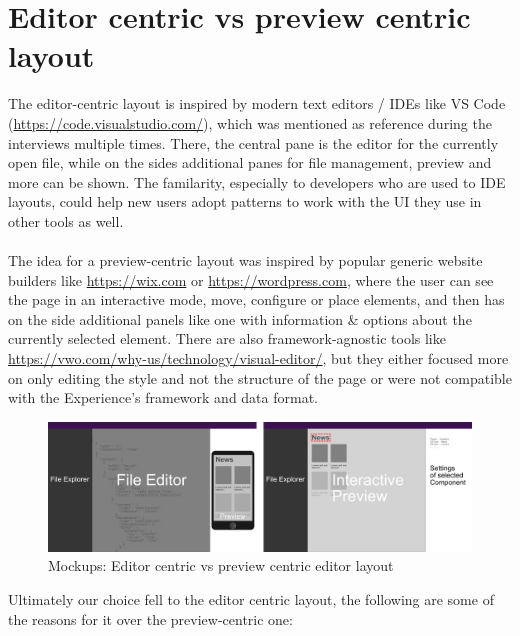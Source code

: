 \section{Editor centric vs preview centric layout}
The editor-centric layout is inspired by modern text editors / IDEs like VS Code (\url{https://code.visualstudio.com/}), which was mentioned as reference during the interviews multiple times.
There, the central pane is the editor for the currently open file, while on the sides additional panes for file management, preview and more can be shown.
The familarity, especially to developers who are used to IDE layouts, could help new users adopt patterns to work with the UI they use in other tools as well.
\\\\
The idea for a preview-centric layout was inspired by popular generic website builders like \url{https://wix.com} or \url{https://wordpress.com}, where the user
can see the page in an interactive mode, move, configure or place elements, and then has on the side additional panels like one with information \& options about the
currently selected element.
There are also framework-agnostic tools like \url{https://vwo.com/why-us/technology/visual-editor/}, but they either focused more on only editing the style and not the structure of the page or were not
compatible with the Experience's framework and data format. 
\begin{figure}[h]
  \includegraphics[width=\textwidth]{pics/editor_centric_vs_preview_centric.png}
  \caption{Mockups: Editor centric vs preview centric editor layout}
\end{figure}
Ultimately our choice fell to the editor centric layout, the following are some of the reasons for it over the preview-centric one:
